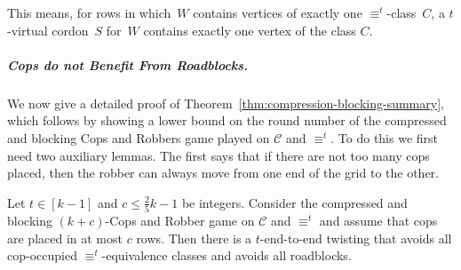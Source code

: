 \documentclass[a4paper,english, thm-restate]{lipics-v2021}
\newcommand{\comp}{\equiv}
\newcommand{\grid}{\mathcal{C}}
\begin{document}
	\noindent This means, for rows in which~$W$ contains vertices of exactly one $\comp^t$-class~$C$,
	a $t$-virtual cordon~$S$ for~$W$ contains exactly one vertex of the class $C$.


\subparagraph{Cops do not Benefit From Roadblocks.}

We now give a detailed proof of Theorem~\ref{thm:compression-blocking-summary}, which follows by showing a lower bound on the round number of the compressed and blocking Cops and Robbers game played on $\grid$ and $\comp^t$. To do this we first need two auxiliary lemmas. The first says that if there are not too many cops placed, then the robber can always move from one end of the grid to the other. 

\begin{lemma}
	Let $t \in [k-1]$ and $c \leq \frac{2}{5}k-1$ be integers.
	Consider the compressed and blocking $(k + c)$-Cops and Robber
	game on $\grid$ and $\comp^t$
	and assume that cops are placed in at most $c$ rows.
	Then there is a $t$\nobreakdash-end-to-end twisting
	that avoids all cop-occupied $\comp^t$\nobreakdash-equivalence classes
	and avoids all roadblocks.
\end{lemma}
\def\ignorepathfigure{}
%
\end{document}
